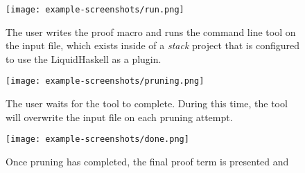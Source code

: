 \begin{figure*}
  \centering

  \begin{subfigure}[t][][t]{1\textwidth}
    \begin{minipage}[c]{0.63\textwidth}
      \texttt{[image: example-screenshots/run.png]}
    \end{minipage} 
    \hfill
    \begin{minipage}[c]{0.3\textwidth}
      \caption{The user writes the proof macro and runs the
         command line tool on the input file, which
        exists inside of a \textit{stack} project that is configured
        to use the LiquidHaskell as a plugin.}
    \end{minipage}
  \end{subfigure}
  \begin{subfigure}[t][][t]{1\textwidth}
    \begin{minipage}[c]{0.3\textwidth}
      \caption{The user waits for the  tool to complete. During
      this time, the tool will overwrite the input file on each pruning attempt.}
    \end{minipage}
    \hfill
    \begin{minipage}[c]{0.63\textwidth}
      \texttt{[image: example-screenshots/pruning.png]}
    \end{minipage}
  \end{subfigure}
  \begin{subfigure}[t][][t]{1\textwidth}
    \begin{minipage}[c]{0.63\textwidth}
      \texttt{[image: example-screenshots/done.png]}
    \end{minipage}
    \hfill
    \begin{minipage}[c]{0.3\textwidth}
      \caption{Once pruning has completed, the final proof term is presented and
}
\end{minipage}
\end{subfigure}
\end{figure*}
